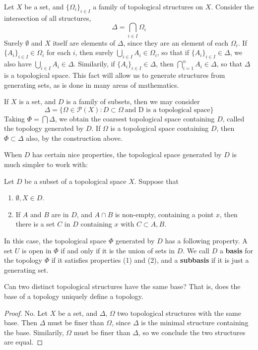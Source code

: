\begin{example}
Let $X$ be a set, and $\{\Omega_i\}_{i \in I}$ a family of topological structures on $X$. Consider the intersection of all structures,
%
\[ \Delta = \bigcap_{i \in I} \Omega_i \]
%
Surely $\emptyset$ and $X$ itself are elements of $\Delta$, since they are an element of each $\Omega_i$. If $\{A_i\}_{i \in I} \in \Omega_i$ for each $i$, then surely $\bigcup_{i \in I} A_i \in \Omega_i$, so that if $\{A_i\}_{i \in I} \in \Delta$, we also have $\bigcup_{i \in I} A_i \in \Delta$. Similarily, if $\{A_i\}_{i \in I} \in \Delta$, then $\bigcap_{i = 1}^n A_i \in \Delta$, so that $\Delta$ is a topological space. This fact will allow us to generate structures from generating sets, as is done in many areas of mathematics.

If $X$ is a set, and $D$ is a family of subsets, then we may consider
%
\[ \Delta = \{ \Omega \in \mathcal{P}(X) : D \subset \Omega\ \text{and D is a topological space} \} \]
%
Taking $\Phi = \bigcap \Delta$, we obtain the coarsest topological space containing $D$, called the topology generated by $D$. If $\Omega$ is a topological space containing $D$, then $\Phi \subset \Delta$ also, by the construction above.

When $D$ has certain nice properties, the topological space generated by $D$ is much simpler to work with:

\begin{definition}
    Let $D$ be a subset of a topological space $X$. Suppose that
    \begin{enumerate}
        \item $\emptyset, X \in D$.
        \item If $A$ and $B$ are in $D$, and $A \cap B$ is non-empty, containing a point $x$, then there is a set $C$ in $D$ containing $x$ with $C \subset A, B$.
    \end{enumerate}
    In this case, the topological space $\Phi$ generated by $D$ has a following property. A set $U$ is open in $\Phi$ if and only if it is the union of sets in $D$. We call $D$ a {\bf basis} for the topology $\Phi$ if it satisfies properties (1) and (2), and a {\bf subbasis} if it is just a generating set.
\end{definition}

\begin{exercise}
    Can two distinct topological structures have the same base? That is, does the base of a topology uniquely define a topology.
\end{exercise}
\begin{proof}
    No. Let $X$ be a set, and $\Delta$, $\Omega$ two topological structures with the same base. Then $\Delta$ must be finer than $\Omega$, since $\Delta$ is the minimal structure containing the base. Similarily, $\Omega$ must be finer than $\Delta$, so we conclude the two structures are equal.
\end{proof}


\end{example}
